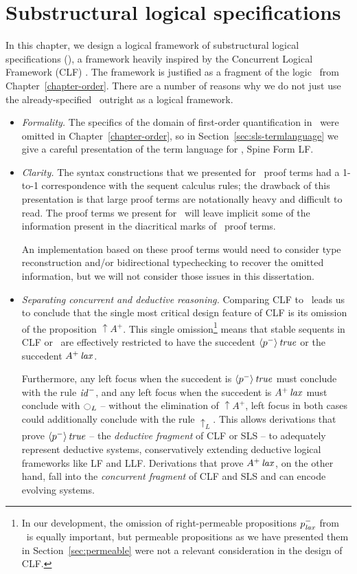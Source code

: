 \chapter{Substructural logical specifications}
\label{chapter-framework}

In this chapter, we design a logical framework of substructural
logical specifications (\sls), a framework heavily inspired by the
Concurrent Logical Framework (CLF) \cite{watkins02concurrent}. The
framework is justified as a fragment of the logic \ollll~from
Chapter~\ref{chapter-order}. 
There are a number of reasons why we do not just use the
already-specified \ollll~outright as a logical framework.
%
\smallskip
\begin{itemize}
\item{\it Formality.} The specifics of the domain of first-order
  quantification in \ollll~were omitted in Chapter~\ref{chapter-order}, so in
  Section~\ref{sec:sls-termlanguage} we give a careful presentation of
  the term language for \sls, Spine Form LF.

\item{\it Clarity.} The syntax constructions that we presented for
  \ollll~proof terms had a 1-to-1 correspondence with the sequent
  calculus rules; the drawback of this presentation is that large
  proof terms are notationally heavy and difficult to read. The proof
  terms we present for \sls~will leave implicit some of the
  information present in the diacritical marks of \ollll~proof
  terms. 

  An implementation based on these proof terms would need to consider
  type reconstruction and/or bidirectional typechecking to recover the
  omitted information, but we will not consider those issues in this
  dissertation.

\item{\it Separating concurrent and deductive reasoning.} Comparing
  CLF to \ollll~leads us to
  conclude that the single most critical design feature of CLF is its
  omission of the proposition ${\uparrow}A^+$. This single
  omission\footnote{In our development, the omission of
    right-permeable propositions $p^-_{\it lax}$ from \ollll~is equally
    important, but permeable propositions as we have presented them in
    Section~\ref{sec:permeable} were not a relevant consideration in
    the design of CLF.} means that stable sequents in CLF or \sls~are
  effectively restricted to have the succedent ${\langle {p^-} \rangle}\,{{\it true}}$
  or the succedent ${A^+}\,{{\it lax}}$.

  Furthermore, any left focus when the succedent is
  ${\langle {p^-} \rangle}\,{{\it true}}$ must conclude with the rule ${\it id}^-$, and
  any left focus when the succedent is ${A^+}\,{{\it lax}}$ must conclude
  with ${\ocircle}_L$ -- without the elimination of ${\uparrow}A^+$,
  left focus in both cases could additionally conclude with the rule
  ${\uparrow}_L$. This allows derivations that prove
  ${\langle {p^-} \rangle}\,{{\it true}}$ -- the {\it deductive fragment} of CLF or SLS
  -- to adequately represent deductive systems, conservatively
  extending deductive logical frameworks like LF and LLF. Derivations
  that prove ${A^+}\,{{\it lax}}$, on the other hand, fall into the {\it
    concurrent fragment} of CLF and SLS and can encode evolving
  systems.
 

\end{itemize}
